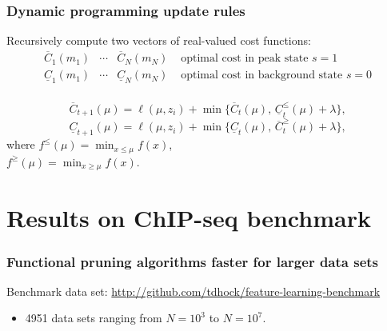 \documentclass{beamer}
\begin{document}
\begin{frame}
  \frametitle{Dynamic programming update rules}
Recursively compute two vectors of real-valued cost functions:
$$
\begin{array}{cccl}
  \overline C_{1}(m_1) & \cdots & \overline C_N(m_{N})& \text{ optimal cost in peak state $s=1$}\\
  \underline C_{1}(m_1) & \cdots & \underline C_N(m_{N})& \text{ optimal cost in background state $s=0$}\\
\end{array}
$$
\begin{minipage}{0.65\linewidth}
  $$\overline C_{t+1}(\mu) = \ell(\mu, z_i) + \min\{
  \overline C_t(\mu),\, 
  \underline C_t^\leq(\mu)+\lambda
\},$$
  $$\underline C_{t+1}(\mu) = \ell(\mu, z_i) + \min\{
  \underline C_t(\mu),\, 
  \overline C_t^\geq(\mu)+\lambda
\},$$
where $f^\leq(\mu) = \min_{x\leq\mu} f(x)$,\\
$f^\geq(\mu) = \min_{x\geq\mu} f(x)$.
\end{minipage}
\begin{minipage}{0.25\linewidth}
\end{minipage}
\end{frame}

\section{Results on ChIP-seq benchmark}

\begin{frame}
  \frametitle{Functional pruning algorithms faster for larger data sets}

Benchmark data set: \url{http://github.com/tdhock/feature-learning-benchmark}

\begin{itemize}
\item 4951 data sets ranging from $N=10^3$ to $N=10^7$.
\end{itemize}
\end{frame}
\end{document}
